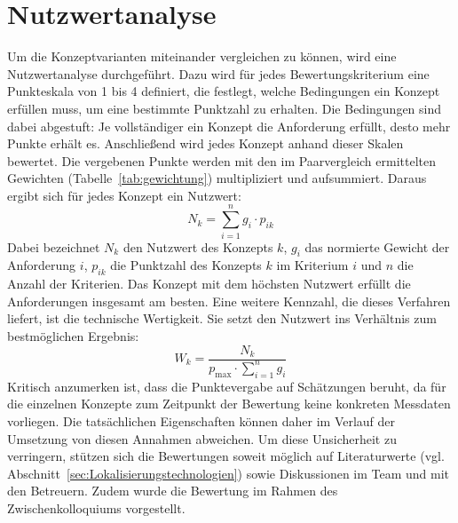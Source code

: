 \section{Nutzwertanalyse}
\label{sec:Nutzwertanalyse}


Um die Konzeptvarianten miteinander vergleichen zu können, wird eine Nutzwertanalyse durchgeführt. Dazu wird für jedes Bewertungskriterium eine Punkteskala von 1 bis 4 definiert, die festlegt, welche Bedingungen ein Konzept erfüllen muss, um eine bestimmte Punktzahl zu erhalten. Die Bedingungen sind dabei abgestuft: Je vollständiger ein Konzept die Anforderung erfüllt, desto mehr Punkte erhält es. Anschließend wird jedes Konzept anhand dieser Skalen bewertet. Die vergebenen Punkte werden mit den im Paarvergleich ermittelten Gewichten (Tabelle~\ref{tab:gewichtung}) multipliziert und aufsummiert. Daraus ergibt sich für jedes Konzept ein Nutzwert:
\begin{equation}
    N_k = \sum_{i=1}^{n} g_i \cdot p_{ik}
    \label{eq:nutzwert}
\end{equation}
Dabei bezeichnet $N_k$ den Nutzwert des Konzepts $k$, $g_i$ das normierte Gewicht der Anforderung $i$, $p_{ik}$ die Punktzahl des Konzepts $k$ im Kriterium $i$ und $n$ die Anzahl der Kriterien. Das Konzept mit dem höchsten Nutzwert erfüllt die Anforderungen insgesamt am besten. Eine weitere Kennzahl, die dieses Verfahren liefert, ist die technische Wertigkeit. Sie setzt den Nutzwert ins Verhältnis zum bestmöglichen Ergebnis:
\begin{equation}
    W_k = \frac{N_k}{p_{\max} \cdot \sum_{i=1}^{n} g_i}
    \label{eq:wertigkeit}
\end{equation}
Kritisch anzumerken ist, dass die Punktevergabe auf Schätzungen beruht, da für die einzelnen Konzepte zum Zeitpunkt der Bewertung keine konkreten Messdaten vorliegen. Die tatsächlichen Eigenschaften können daher im Verlauf der Umsetzung von diesen Annahmen abweichen. Um diese Unsicherheit zu verringern, stützen sich die Bewertungen soweit möglich auf Literaturwerte (vgl. Abschnitt~\ref{sec:Lokalisierungstechnologien}) sowie Diskussionen im Team und mit den Betreuern. Zudem wurde die Bewertung im Rahmen des Zwischenkolloquiums vorgestellt.


